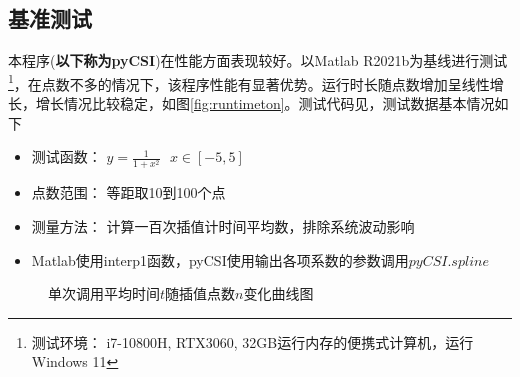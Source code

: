 \documentclass[a4paper,twoside]{article}
\begin{document}
\begin{spacing}{1.2}
\section{基准测试}

本程序(\textbf{以下称为pyCSI})在性能方面表现较好。以Matlab R2021b为基线进行测试\footnote{测试环境： i7-10800H, RTX3060, 32GB运行内存的便携式计算机，运行Windows 11}，在点数不多的情况下，该程序性能有显著优势。运行时长随点数增加呈线性增长，增长情况比较稳定，如图\ref{fig:runtimeton}。测试代码见，测试数据基本情况如下

\begin{itemize}
	\item 测试函数： $y=\frac{1}{1+x^2} \ \ \ x \in [-5,5]$
	\item 点数范围： 等距取10到100个点
	\item 测量方法： 计算一百次插值计时间平均数，排除系统波动影响
	\item Matlab使用interp1函数，pyCSI使用输出各项系数的参数调用$pyCSI.spline$
\end{itemize}

\begin{figure}[h]
	\caption{单次调用平均时间$t$随插值点数$n$变化曲线图}
	

\end{figure}
\end{spacing}
\end{document}
